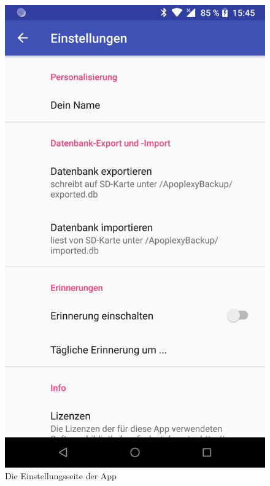 \begin{multicols}{2}
\begin{figure}[H]
	\includegraphics[scale=0.1]{pics/device-settings.png}
	\caption{Die Einstellungsseite der App}
\end{figure}
\begin{figure}[H]
	\centering

\end{figure}
\end{multicols}
